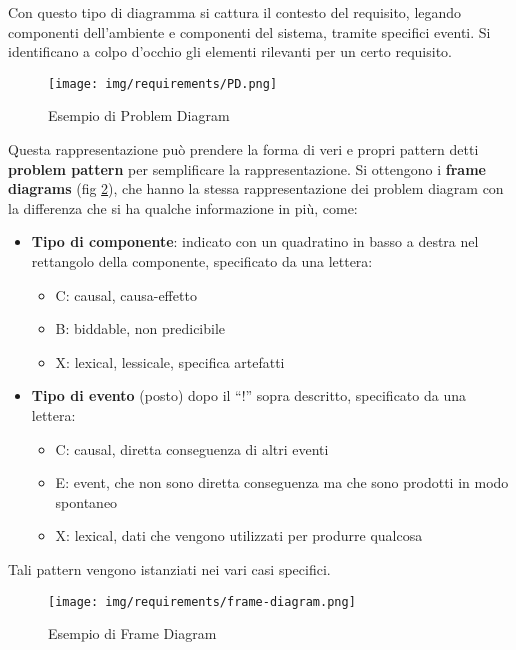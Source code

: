 Con questo tipo di diagramma si cattura il contesto del requisito, legando
componenti dell'ambiente e componenti del sistema, tramite specifici eventi.
Si identificano a colpo d'occhio gli elementi rilevanti per un certo requisito.
\begin{figure}[!ht]
      \centering
      \texttt{[image: img/requirements/PD.png]}
      \caption{Esempio di Problem Diagram}
      \label{fig:problemDiagram}
\end{figure}
Questa rappresentazione può prendere la forma di veri e propri pattern detti
\textbf{problem pattern} per semplificare la rappresentazione. Si ottengono i
\textbf{frame diagrams} (fig \ref{fig:frame-diagram}), che hanno la stessa
rappresentazione dei problem diagram con la differenza che si ha qualche informazione
in più, come:
\begin{itemize}
      \item \textbf{Tipo di componente}: indicato con un quadratino in basso a
            destra nel rettangolo della componente, specificato da una lettera:
            \begin{itemize}
                  \item C: causal, causa-effetto
                  \item B: biddable, non predicibile
                  \item X: lexical, lessicale, specifica artefatti
            \end{itemize}
      \item \textbf{Tipo di evento} (posto) dopo il “!” sopra descritto,
            specificato da una lettera:
            \begin{itemize}
                  \item C: causal, diretta conseguenza di altri eventi
                  \item E: event, che non sono diretta conseguenza ma che sono
                        prodotti in modo spontaneo
                  \item X: lexical, dati che vengono utilizzati per produrre
                        qualcosa
            \end{itemize}
\end{itemize}
Tali pattern vengono istanziati nei vari casi specifici.
\begin{figure}[!ht]
      \centering
      \texttt{[image: img/requirements/frame-diagram.png]}
      \caption{Esempio di Frame Diagram}
      \label{fig:frame-diagram}
\end{figure}
